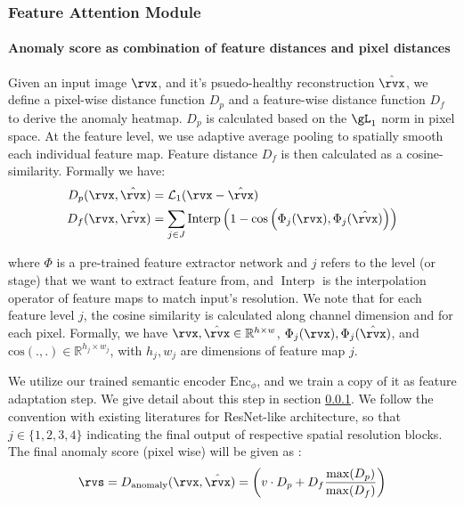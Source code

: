 \subsubsection{Feature Attention Module}
\label{sec:feature-extractor-network}

\paragraph{Anomaly score as combination of feature distances and pixel distances} Given an input image $\rvx$, and it's psuedo-healthy reconstruction $\hat{\rvx}$, we define a pixel-wise distance function $D_p$ and a feature-wise distance function $D_f$ to derive the anomaly heatmap. $D_p$ is calculated based on the $\gL_1$ norm in pixel space. At the feature level, we use adaptive average pooling to spatially smooth each individual feature map. Feature distance $D_f$ is then calculated as a cosine-similarity. Formally we have: 
\begin{align}
D_p(\rvx, \hat{\rvx}) &= \mathcal{L}_1(\rvx - \hat{\rvx}) \\
D_f(\rvx, \hat{\rvx}) &= \sum_{j \in J} \operatorname{Interp}\left(1 - \cos\left(\Phi_j(\rvx), \Phi_j(\hat{\rvx})\right)\right)
\end{align}

where $\Phi$ is a pre-trained feature extractor network and $j$ refers to the level (or stage) that we want to extract feature from, and $\operatorname{Interp}$ is the interpolation operator of feature maps to match input's resolution. We note that for each feature level $j$, the cosine similarity is calculated along channel dimension and for each pixel. Formally, we have $\rvx, \hat\rvx \in \mathbb{R}^{h \times w}$, $\Phi_j(\rvx), \Phi_j(\hat\rvx)$, and $\mathrm{cos}(., .) \in \mathbb{R}^{h_j \times w_j}$, with $h_j, w_j$ are dimensions of feature map $j$. 

We utilize our trained semantic encoder $\mathrm{Enc}_{\phi}$, and we train a copy of it as feature adaptation step. We give detail about this step in section \ref{sec:feature-extractor-network}. We follow the convention with existing literatures for ResNet-like architecture, so that $j \in \{1, 2, 3, 4\}$ indicating the final output of respective spatial resolution blocks. The final anomaly score (pixel wise) will be given as \cite{DDAD}: 
\begin{align}
    \rvs = D_\textnormal{anomaly} (\rvx, \hat{\rvx}) = \left( v \cdot D_p + D_f \frac{\max(D_p)}{\max(D_f)} \right)
\end{align}


